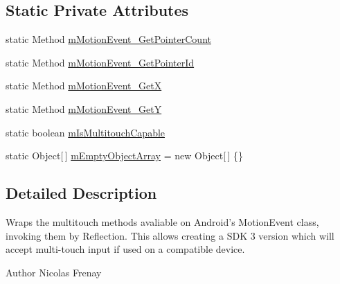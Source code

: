 \subsection*{\-Static \-Private \-Attributes}
\begin{DoxyCompactItemize}
\item 
static \-Method \hyperlink{classcom_1_1_cyberpad_1_1_reroot_1_1_wrapped_motion_event_afeba5ad9db0614829e54399c82ed0952}{m\-Motion\-Event\-\_\-\-Get\-Pointer\-Count}
\item 
static \-Method \hyperlink{classcom_1_1_cyberpad_1_1_reroot_1_1_wrapped_motion_event_a7b43f515bd9c836d2b36ca4a1853ab97}{m\-Motion\-Event\-\_\-\-Get\-Pointer\-Id}
\item 
static \-Method \hyperlink{classcom_1_1_cyberpad_1_1_reroot_1_1_wrapped_motion_event_add2b27453c5e5dea6ba2f8f43ca770ac}{m\-Motion\-Event\-\_\-\-Get\-X}
\item 
static \-Method \hyperlink{classcom_1_1_cyberpad_1_1_reroot_1_1_wrapped_motion_event_ab9730a4ed39eafe1b1b07c90c7fcc199}{m\-Motion\-Event\-\_\-\-Get\-Y}
\item 
static boolean \hyperlink{classcom_1_1_cyberpad_1_1_reroot_1_1_wrapped_motion_event_aaec88186e6e9b5af5c918defcfa40b10}{m\-Is\-Multitouch\-Capable}
\item 
static \-Object\mbox{[}$\,$\mbox{]} \hyperlink{classcom_1_1_cyberpad_1_1_reroot_1_1_wrapped_motion_event_a76b11ad6966ef9268f4d88c3f5092030}{m\-Empty\-Object\-Array} = new \-Object\mbox{[}$\,$\mbox{]} \{\}
\end{DoxyCompactItemize}


\subsection{\-Detailed \-Description}
\-Wraps the multitouch methods avaliable on \-Android's \-Motion\-Event class, invoking them by \-Reflection. \-This allows creating a \-S\-D\-K 3 version which will accept multi-\/touch input if used on a compatible device.

\begin{DoxyAuthor}{\-Author}
\-Nicolas \-Frenay 
\end{DoxyAuthor}


